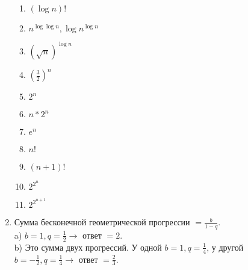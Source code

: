 \documentclass[12pt]{article} %
\begin{document}
\begin{enumerate}
\begin{enumerate}
	  \item $(\log n)!$ \\
	  \item $n^{\log \log n}, \log n^{\log n}$ \\
	  \item $ (\sqrt n)^{\log n} $ \\
	  \item $(\frac{3}{2})^n$ \\
	  \item $2^n$ \\
	  \item $n * 2^n$ \\
	  \item $e^n$ \\
	  \item $n!$\\
	  \item $(n + 1)!$ \\
	  \item $2^{2^n}$ \\
	  \item $2^{2^{n+1}}$ \\
	\end{enumerate}
  \item Сумма бесконечной геометрической прогрессии $ = \frac {b}{1 - q}$.\\
	a) $b = 1, q = \frac {1}{2} \to$ ответ $ = 2$. \\
	b) Это сумма двух прогрессий. У одной $b = 1, q = \frac {1}{4}$, у другой $b = -\frac{1}{2}, q = \frac{1}{4} \to $ ответ $ = \frac {2}{3}$. \\

\end{enumerate}
\end{document}
